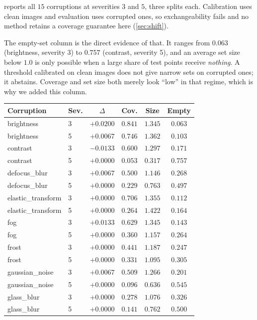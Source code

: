  reports all $15$ corruptions at severities $3$ and $5$, three splits
each. Calibration uses clean images and evaluation uses corrupted ones, so exchangeability
fails and no method retains a coverage guarantee here (\cref{sec:shift}).

The empty-set column is the direct evidence of that. It ranges from
$0.063$ (brightness, severity 3) to
$0.757$ (contrast, severity 5), and an
average set size below $1.0$ is only possible when a large share of test points receive
\emph{nothing}. A threshold calibrated on clean images does not give narrow sets on corrupted
ones; it abstains. Coverage and set size both merely look ``low'' in that regime, which is why
we added this column.

\begin{table}[h]
\centering
\small
\setlength{\tabcolsep}{3pt}
\begin{tabular}{llcccc}
\toprule
Corruption & Sev. & $\Delta$ & Cov. & Size & Empty \\
\midrule
brightness & 3 & $+0.0200$ & $0.841$ & $1.345$ & $0.063$ \\
brightness & 5 & $+0.0067$ & $0.746$ & $1.362$ & $0.103$ \\
contrast & 3 & $-0.0133$ & $0.600$ & $1.297$ & $0.171$ \\
contrast & 5 & $+0.0000$ & $0.053$ & $0.317$ & $0.757$ \\
defocus\_blur & 3 & $+0.0067$ & $0.500$ & $1.146$ & $0.268$ \\
defocus\_blur & 5 & $+0.0000$ & $0.229$ & $0.763$ & $0.497$ \\
elastic\_transform & 3 & $+0.0000$ & $0.706$ & $1.355$ & $0.112$ \\
elastic\_transform & 5 & $+0.0000$ & $0.264$ & $1.422$ & $0.164$ \\
fog & 3 & $+0.0133$ & $0.629$ & $1.345$ & $0.143$ \\
fog & 5 & $+0.0000$ & $0.360$ & $1.157$ & $0.264$ \\
frost & 3 & $+0.0000$ & $0.441$ & $1.187$ & $0.247$ \\
frost & 5 & $+0.0000$ & $0.331$ & $1.095$ & $0.305$ \\
gaussian\_noise & 3 & $+0.0067$ & $0.509$ & $1.266$ & $0.201$ \\
gaussian\_noise & 5 & $+0.0000$ & $0.096$ & $0.636$ & $0.545$ \\
glass\_blur & 3 & $+0.0000$ & $0.278$ & $1.076$ & $0.326$ \\
glass\_blur & 5 & $+0.0000$ & $0.141$ & $0.762$ & $0.500$ \\

\end{tabular}
\end{table}
